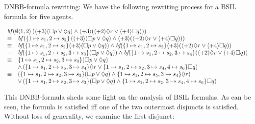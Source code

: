 \documentclass[11pt]{article}
\newcommand{\embf}{\textit{bf}}
\newcommand{\pfrr}{\Box}
\newcommand{\pevt}{\Diamond}
\begin{document}
{\example \label{exmp.dn-bbf} DNBB-formula rewriting:}
We have the following rewriting process for a BSIL formula for five agents.
\begin{center}
$\begin{array}{ll}
\multicolumn{2}{l}{
  \embf\left(\emptyset\langle 1,2\rangle\left( 
    	\langle+3\rangle(\pfrr p\vee \pevt q
    	) 
  \wedge \langle+3\rangle(\langle+2\rangle \pevt r
	\vee \langle+ 4\rangle\pfrr q)
  \right) \right) }\\ 

\equiv	&  
\embf\left(\{1\mapsto s_1,2\mapsto s_2\}\left( 
    	\langle+3\rangle(\pfrr p\vee \pevt q
    	) 
  \wedge \langle+3\rangle(\langle+2\rangle \pevt r\vee \langle+ 4\rangle\pfrr q)
  \right)\right)\\ 

\equiv & %
\embf(\{1\mapsto s_1,2\mapsto s_2\}\langle+3\rangle(\pfrr p\vee \pevt q)) %
\wedge %
  \embf(\{1\mapsto s_1,2\mapsto s_2\}\langle+3\rangle(
    \langle+2\rangle \pevt r\vee \langle+ 4\rangle\pfrr q
  ))
\\ 
\equiv & \embf(\{1\mapsto s_1,2\mapsto s_2,3\mapsto s_3\}(
	    \pfrr p\vee \pevt q
	    )) 
	\wedge  
	  \embf(\{1\mapsto s_1,2\mapsto s_2, 3\mapsto s_4\}
	    (\langle+ 2\rangle \pevt r\vee \langle+ 4\rangle\pfrr q))
	\\ 
\equiv & \{1\mapsto s_1,2\mapsto s_2,3\mapsto s_3\}(
	    \pfrr p\vee \pevt q
	    )\\ 
	& \wedge \left(
	  \{1\mapsto s_1, 2\mapsto s_5,3\mapsto s_4\}
	    \pevt r
	  \vee 
	  \{1\mapsto s_1,2\mapsto s_2,3\mapsto s_4, 4\mapsto s_6\}
	     \pfrr q\right)
	\\ 
\equiv & \left(\{1\mapsto s_1,2\mapsto s_2,3\mapsto s_3\}(
	    \pfrr p\vee \pevt q
	    )\wedge \{1\mapsto s_1, 2\mapsto s_5,3\mapsto s_4\}
	    \pevt r\right)\\ 
	& \vee \left(\{1\mapsto s_1,2\mapsto s_2,3\mapsto s_3\}(
	    \pfrr p\vee \pevt q
	    )\wedge  
	  \{1\mapsto s_1,2\mapsto s_2,3\mapsto s_4, 4\mapsto s_6\}
	     \pfrr q\right)
	\\ 
\end{array}$
\end{center} 
This DNBB-formula sheds some light on the analysis of BSIL formulas.
As can be seen,
the formula is satisfied iff one of the two 
outermost disjuncts is satisfied.
Without loss of generality, we examine the first disjunct: 
\end{document}
